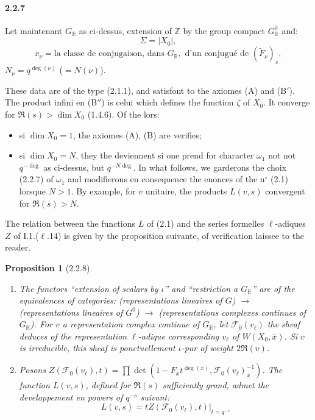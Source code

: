 \documentclass[12pt,a4paper]{article}
\theoremstyle{plain}
\newtheorem{proposition}[theorem]{Proposition}
\theoremstyle{definition}
\theoremstyle{remark}
\newcommand{\RR}{{\mathbb{R}}}
\newcommand{\ZZ}{{\mathbb{Z}}}
\begin{document}
\paragraph{2.2.7}
Let maintenant $G_\RR$ as ci-dessus, extension of $\ZZ$ by the group compact $G_\RR^0$ and:
\[ \Sigma = |X_0|, \]
\[ x_\nu = \text{la classe de conjugaison, dans } G_\RR, \text{ d'un conjugu\'e de } (\tilde{F}_\nu)_s, \]
$N_\nu = q^{\deg(\nu)}$ ($= N(\nu)$).

These data are of the type (2.1.1), and satisfont to the axiomes (A) and (B$'$). The product infini en (B$''$) is celui which defines the function $\zeta$ of $X_0$. It converge for $\Re(s) > \dim X_0$ (1.4.6). Of the lors:
\begin{itemize}
\item si $\dim X_0 = 1$, the axiomes (A), (B) are verifies;
\item si $\dim X_0 = N$, they the deviennent si one prend for character $\omega_1$ not not $q^{-\deg}$ as ci-dessus, but $q^{-N\deg}$. In what follows, we garderons the choix (2.2.7) of $\omega_1$ and modifierons en consequence the enonces of the n$^\circ$ (2.1) lorsque $N > 1$. By example, for $v$ unitaire, the products $L(v,s)$ convergent for $\Re(s) > N$.
\end{itemize}

The relation between the functions $L$ of (2.1) and the series formelles $\ell$-adiques $Z$ of I.1.($\ell$.14) is given by the proposition suivante, of verification laissee to the reader.


\begin{proposition}[2.2.8]
\begin{enumerate}[label=(\roman*)]
\item The functors ``extension of scalars by $\iota$'' and ``restriction a $G_\RR$'' are of the equivalences of categories: (representations lineaires of $G$) $\to$ (representations lineaires of $G^0$) $\to$ (representations complexes continues of $G_\RR$). For $v$ a representation complex continue of $G_\RR$, let $\mathscr{F}_0(v_\ell)$ the sheaf deduces of the representation $\ell$-adique corresponding $v_\ell$ of $W(X_0, \overline{x})$. Si $v$ is irreducible, this sheaf is ponctuellement $\iota$-pur of weight $2\Re(v)$.
\item Posons $Z(\mathscr{F}_0(v_\ell), t) = \prod \det(1 - F_x t^{\deg(x)}, \mathscr{F}_0(v_\ell)_x^{-1})$. The function $L(v,s)$, defined for $\Re(s)$ sufficiently grand, admet the developpement en powers of $q^{-s}$ suivant:
\begin{equation}\label{eq:2.2.8.1}
L(v,s) = tZ(\mathscr{F}_0(v_\ell), t)|_{t = q^{-s}}
\end{equation}
\end{enumerate}
\end{proposition}
\end{document}
